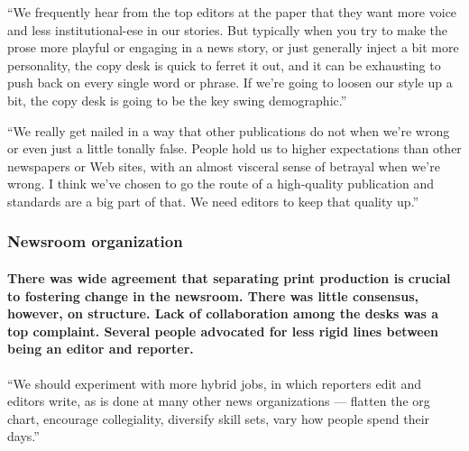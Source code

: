 ``We frequently hear from the top editors at the paper that they want
more voice and less institutional-ese in our stories. But typically when
you try to make the prose more playful or engaging in a news story, or
just generally inject a bit more personality, the copy desk is quick to
ferret it out, and it can be exhausting to push back on every single
word or phrase. If we're going to loosen our style up a bit, the copy
desk is going to be the key swing demographic.''

``We really get nailed in a way that other publications do not when
we're wrong or even just a little tonally false. People hold us to
higher expectations than other newspapers or Web sites, with an almost
visceral sense of betrayal when we're wrong. I think we've chosen to go
the route of a high-quality publication and standards are a big part of
that. We need editors to keep that quality up.''

\hypertarget{newsroom-organization}{%
\subsubsection{Newsroom organization}\label{newsroom-organization}}

\hypertarget{there-was-wide-agreement-that-separating-print-production-is-crucial-to-fostering-change-in-the-newsroom-there-was-little-consensus-however-on-structure-lack-of-collaboration-among-the-desks-was-a-top-complaint-several-people-advocated-for-less-rigid-lines-between-being-an-editor-and-reporter}{%
\paragraph{There was wide agreement that separating print production is
crucial to fostering change in the newsroom. There was little consensus,
however, on structure. Lack of collaboration among the desks was a top
complaint. Several people advocated for less rigid lines between being
an editor and
reporter.}\label{there-was-wide-agreement-that-separating-print-production-is-crucial-to-fostering-change-in-the-newsroom-there-was-little-consensus-however-on-structure-lack-of-collaboration-among-the-desks-was-a-top-complaint-several-people-advocated-for-less-rigid-lines-between-being-an-editor-and-reporter}}

``We should experiment with more hybrid jobs, in which reporters edit
and editors write, as is done at many other news organizations ---
flatten the org chart, encourage collegiality, diversify skill sets,
vary how people spend their days.''


